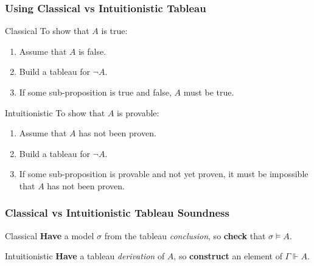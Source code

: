 \documentclass[mathserif]{beamer}
\newcommand{\sat}[1]{\sigma \vDash #1}
\newcommand{\force}[1]{\Gamma \Vdash #1}
\begin{document}
\begin{frame}
\frametitle{Using Classical vs Intuitionistic Tableau}

\begin{block}{Classical}
To show that $A$ is true:
\begin{enumerate}
\item Assume that $A$ is false.
\item Build a tableau for $\neg A$.
\item If some sub-proposition is true and false, $A$ must be true.
\end{enumerate}
\end{block}

\begin{block}{Intuitionistic}
To show that $A$ is provable:
\begin{enumerate}
\item Assume that $A$ has not been proven.
\item Build a tableau for $\neg A$.
\item If some sub-proposition is provable and not yet proven,
it must be impossible that $A$ has not been proven.
\end{enumerate}
\end{block}

\end{frame}

\begin{frame}
\frametitle{Classical vs Intuitionistic Tableau Soundness}

\begin{block}{Classical}
{\bf Have} a model $\sigma$ from the tableau {\it conclusion}, so
{\bf check} that $\sat{A}$.
\end{block}

\begin{block}{Intuitionistic}
{\bf Have} a tableau {\it derivation} of $A$, so
{\bf construct} an element of $\force{A}$.
\end{block}

\end{frame}
\end{document}
